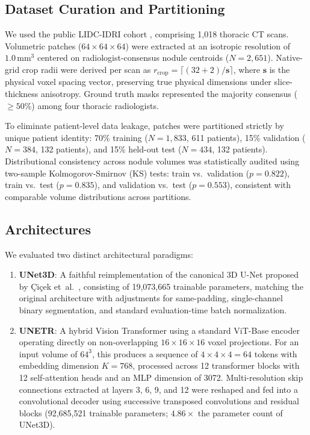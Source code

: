 \documentclass[10pt, a4paper, twocolumn]{article}
\begin{document}
\subsection{Dataset Curation and Partitioning}
We used the public LIDC-IDRI cohort \cite{armato2011lidc}, comprising 1,018 thoracic CT scans. Volumetric patches ($64\times64\times64$) were extracted at an isotropic resolution of $1.0\,\text{mm}^{3}$ centered on radiologist-consensus nodule centroids ($N=2,651$). Native-grid crop radii were derived per scan as $r_{\text{crop}} = \lceil (32 + 2) / \mathbf{s} \rceil$, where $\mathbf{s}$ is the physical voxel spacing vector, preserving true physical dimensions under slice-thickness anisotropy. Ground truth masks represented the majority consensus ($\ge50\%$) among four thoracic radiologists.

To eliminate patient-level data leakage, patches were partitioned strictly by unique patient identity: 70\% training ($N=1,833$, 611 patients), 15\% validation ($N=384$, 132 patients), and 15\% held-out test ($N=434$, 132 patients). Distributional consistency across nodule volumes was statistically audited using two-sample Kolmogorov-Smirnov (KS) tests: train vs.\ validation ($p=0.822$), train vs.\ test ($p=0.835$), and validation vs.\ test ($p=0.553$), consistent with comparable volume distributions across partitions.

\subsection{Architectures}
We evaluated two distinct architectural paradigms:
\begin{enumerate}
    \item \textbf{UNet3D}: A faithful reimplementation of the canonical 3D U-Net proposed by \c{C}i\c{c}ek et~al.~\cite{cicek20163d}, consisting of 19,073,665 trainable parameters, matching the original architecture with adjustments for same-padding, single-channel binary segmentation, and standard evaluation-time batch normalization.
    \item \textbf{UNETR}: A hybrid Vision Transformer \cite{hatamizadeh2022unetr} using a standard ViT-Base encoder operating directly on non-overlapping $16 \times 16 \times 16$ voxel projections. For an input volume of $64^3$, this produces a sequence of $4 \times 4 \times 4 = 64$ tokens with embedding dimension $K=768$, processed across 12 transformer blocks with 12 self-attention heads and an MLP dimension of 3072. Multi-resolution skip connections extracted at layers 3, 6, 9, and 12 were reshaped and fed into a convolutional decoder using successive transposed convolutions and residual blocks (92,685,521 trainable parameters; $4.86\times$ the parameter count of UNet3D).
\end{enumerate}
\end{document}
